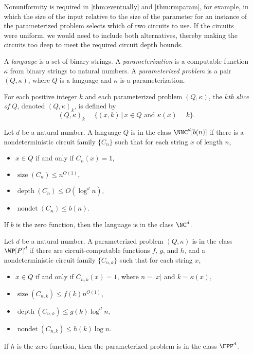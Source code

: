 \documentclass{article}
\DeclareMathOperator{\depth}{depth}
\DeclareMathOperator{\nondet}{nondet}
\DeclareMathOperator{\size}{size}
\begin{document}
Nonuniformity is required in \autoref{thm:eventually} and \autoref{thm:rmparam}, for example, in which the size of the input relative to the size of the parameter for an instance of the parameterized problem selects which of two circuits to use.
If the circuits were uniform, we would need to include both alternatives, thereby making the circuits too deep to meet the required circuit depth bounds.

\begin{definition}
  A \emph{language} is a set of binary strings.
  A \emph{parameterization} is a computable function $\kappa$ from binary strings to natural numbers.
  A \emph{parameterized problem} is a pair $(Q, \kappa)$, where $Q$ is a language and $\kappa$ is a parameterization.
\end{definition}

\begin{definition}
  For each positive integer $k$ and each parameterized problem $(Q, \kappa)$, the \emph{$k$th slice of $Q$}, denoted $(Q, \kappa)_k$, is defined by
  \[
  (Q, \kappa)_k = \{(x, k) \, | \, x \in Q \text{ and } \kappa(x) = k\}.
  \]
\end{definition}

\begin{definition}
  Let $d$ be a natural number.
  A language $Q$ is in the class $\NNC^d[b(n)]$ if there is a nondeterministic circuit family $\{C_n\}$ such that for each string $x$ of length $n$,
  \begin{itemize}
  \item $x \in Q$ if and only if $C_n(x) = 1$,
  \item $\size(C_n) \leq n^{O(1)}$,
  \item $\depth(C_n) \leq O(\log^d n)$,
  \item $\nondet(C_n) \leq b(n)$.
  \end{itemize}
  If $b$ is the zero function, then the language is in the class $\NC^d$.
\end{definition}

\begin{definition}
  Let $d$ be a natural number.
  A parameterized problem $(Q, \kappa)$ is in the class $\WP[P]^d$ if there are circuit-computable functions $f$, $g$, and $h$, and a nondeterministic circuit family $\{C_{n, k}\}$ such that for each string $x$,
  \begin{itemize}
  \item $x \in Q$ if and only if $C_{n, k}(x) = 1$, where $n = |x|$ and $k = \kappa(x)$,
  \item $\size(C_{n, k}) \leq f(k) n^{O(1)}$,
  \item $\depth(C_{n, k}) \leq g(k) \log^d n$,
  \item $\nondet(C_{n, k}) \leq h(k) \log n$.
  \end{itemize}
  If $h$ is the zero function, then the parameterized problem is in the class $\FPP^d$.
\end{definition}
\end{document}
